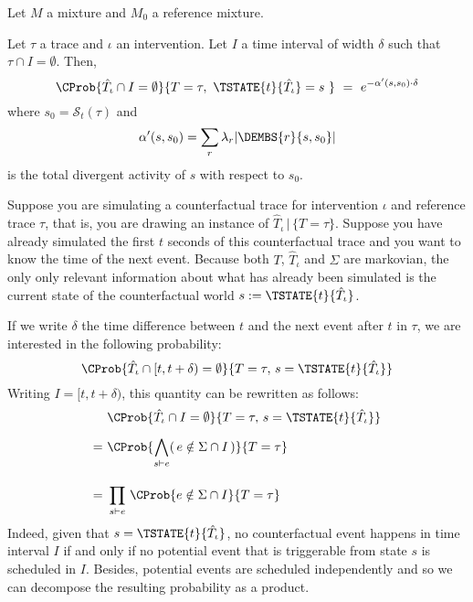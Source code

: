 \begin{definition}
  Let $M$ a mixture and $M_0$ a reference mixture.
\end{definition}

\begin{definition}
  
\end{definition}

\begin{theorem} Let $\tau$ a trace and $\iota$ an intervention. Let
  $I$ a time interval of width $\delta$ such that
  $\tau \cap I = \emptyset$. Then,
  \[\CProb{ \hat T_\iota \cap I = \emptyset }{ T=\tau,\
      \TSTATE{t}{\hat T_\iota} = s\ }
    \ =\ e^{-\alpha'(s, s_0) \cdot \delta}
  \]
  where $s_0 = \mathcal{S}_t(\tau)$ and
  \[\alpha'(s, s_0) = \sum_r \lambda_r |\DEMBS{r}{s, s_0}| \]
  is the total divergent activity of $s$ with respect to $s_0$.
\end{theorem}

Suppose you are simulating a counterfactual trace for intervention
$\iota$ and reference trace $\tau$, that is, you are drawing an
instance of $\hat T_\iota \,|\, \{T=\tau\}$. Suppose you have already
simulated the first $t$ seconds of this counterfactual trace and you
want to know the time of the next event. Because both $T$,
$\hat T_\iota$ and $\Sigma$ are markovian, the only only relevant
information about what has already been simulated is the current state
of the counterfactual world $s := \TSTATE{t}{\hat T_\iota}$.


If we write $\delta$ the time difference between $t$ and the next
event after $t$ in $\tau$, we are interested in the following
probability:
\begin{equation}
  \CProb{ \hat T_\iota \cap [t, t+\delta) = \emptyset  }
  { T=\tau,\, s = \TSTATE{t}{\hat T_\iota} }
\end{equation}
Writing $I = [t, t+\delta)$, this quantity can be rewritten as
follows:
\begin{align}
  \ & \ \CProb{ \hat T_\iota \cap I = \emptyset }
      { T=\tau,\, s = \TSTATE{t}{\hat T_\iota} } \\[0.5em]
  = & \ \CProb{ \bigwedge_{s \vdash e} (\,e \notin \Sigma \cap I \,)  }{ T=\tau } \\[1em]
  = & \ \prod_{s \vdash e}\, \CProb{e \notin \Sigma \cap I }{ T=\tau }
\end{align}
Indeed, given that $s = \TSTATE{t}{\hat T_\iota}$, no counterfactual
event happens in time interval $I$ if and only if no potential event
that is triggerable from state $s$ is scheduled in $I$.  Besides,
potential events are scheduled independently and so we can decompose
the resulting probability as a product.

